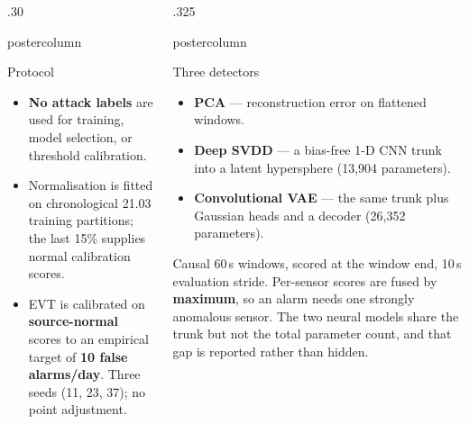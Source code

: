 \documentclass{beamer}
\newlength{\columnheight}
\begin{document}
\begin{frame}
\begin{columns}
\begin{column}{.30\textwidth}
\begin{beamercolorbox}[center]{postercolumn}
\begin{minipage}{.98\textwidth}
{\begin{myblock}{Protocol}
\begin{itemize}
  \item \textbf{No attack labels} are used for training, model selection, or
        threshold calibration.
  \item Normalisation is fitted on chronological 21.03 training partitions; the last
        15\% supplies normal calibration scores.
  \item EVT is calibrated on \textbf{source-normal} scores to an empirical target of
        \textbf{10 false alarms/day}. Three seeds (11, 23, 37); no point adjustment.
\end{itemize}
\end{myblock}

}\end{minipage}\end{beamercolorbox}
\end{column}

\begin{column}{.325\textwidth}
\begin{beamercolorbox}[center]{postercolumn}
\begin{minipage}{.98\textwidth}
\parbox[t][\columnheight]{\textwidth}{

\begin{myblock}{Three detectors}
\begin{itemize}
  \item \textbf{PCA} --- reconstruction error on flattened windows.
  \item \textbf{Deep SVDD} --- a bias-free 1-D CNN trunk into a latent hypersphere
        (13{,}904 parameters).
  \item \textbf{Convolutional VAE} --- the same trunk plus Gaussian heads and a
        decoder (26{,}352 parameters).
\end{itemize}

\vspace{0.2cm}
Causal 60\,s windows, scored at the window end, 10\,s evaluation stride. Per-sensor
scores are fused by \textbf{maximum}, so an alarm needs one strongly anomalous
sensor. The two neural models share the trunk but not the total parameter count, and
that gap is reported rather than hidden.
\end{myblock}\vfill

}
\end{minipage}
\end{beamercolorbox}
\end{column}
\end{columns}
\end{frame}
\end{document}
